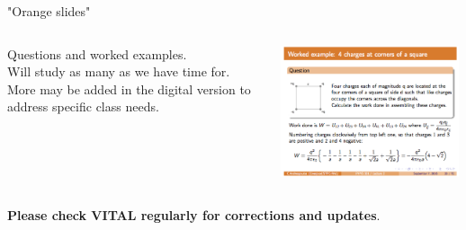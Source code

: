 %
%
%


\begin{frame}{"Orange slides"}

\begin{columns}
  \begin{column}{0.30\textwidth}
   \begin{center}
      Questions and worked examples.\\
      \vspace{0.2cm}
      Will study as many as we have time for.
      More may be added in the digital version to address specific class needs.\\
   \end{center}
  \end{column}
  \begin{column}{0.70\textwidth}
   \begin{center}
     \includegraphics[width=0.99\textwidth]{./images/example_slides/worked_example.png}\\
   \end{center}
  \end{column}
\end{columns}

\vspace{0.2cm}

\begin{center}
 {\bf Please check VITAL regularly for corrections and updates}.\\
\end{center}

\end{frame}

%
%
%


